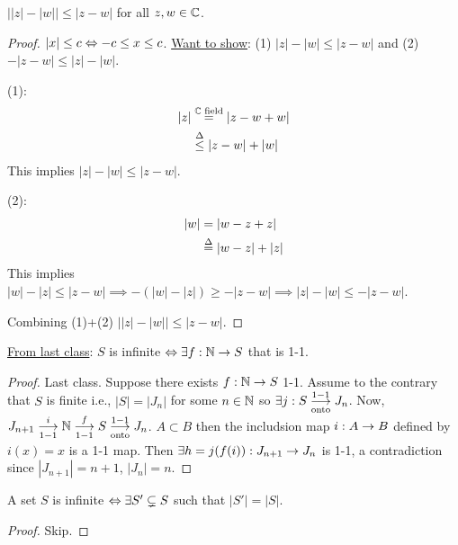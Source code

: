 \documentclass[]{article}
\begin{document}
\begin{example}
	[HW3.4] $\left| |z|-|w|\right| \leq |z-w|$ for all $z,w\in\mathbb{C}$.
	\begin{proof}
		$|x|\leq c \Leftrightarrow -c\leq x \leq c$.
		\ul{Want to show}: (1) $|z|-|w| \leq |z-w|$ and (2) $-|z-w|\leq |z|-|w|$.

		(1): 
		\begin{align*}
			|z| &\overset{\mathbb{C}\text{ field}}{=} |z-w+w| \\
				&\overset{\Delta}{\leq} |z-w| + |w|		
		\end{align*}
		This implies $|z|-|w|\leq |z-w|$.

		(2):
		\begin{align*}
			|w| &= |w-z+z| \\
				&\overset{\Delta}{=} |w-z|+|z|
		\end{align*}
		This implies $|w|-|z|\leq |z-w| \implies -(|w|-|z|) \geq -|z-w| \implies |z|-|w| \leq -|z-w|$.
		
		Combining (1)+(2) $\left||z|-|w|\right| \leq |z-w|$.
	\end{proof}
\end{example}

\begin{recall}
	\ul{From last class}: $S$ is infinite $\Leftrightarrow \exists f:\mathbb{N} \rightarrow S$ that is 1-1.
\end{recall}
\begin{proof}
	\say{$\implies$} Last class.
	\say{$\Lla$} Suppose there exists $f:\mathbb{N} \rightarrow S$ 1-1.
	Assume to the contrary that $S$ is finite i.e., $|S| = |J_n|$ for some $n\in\mathbb{N}$ so $\exists j:S\overset{1-1}{\underset{\text{onto}}{\longrightarrow}} J_n$.
	Now, $J_{n+1} \overset{i}{\underset{1-1}{\longrightarrow}} \mathbb{N} \overset{f}{\underset{1-1}{\longrightarrow}} S \overset{1-1}{\underset{\text{onto}}{\longrightarrow}} J_n$.
	$A\subset B$ then the includsion map $i:A\rightarrow B$ defined by $i(x) = x$ is a 1-1 map.
	Then $\exists h = j(f(i)): J_{n+1} \rightarrow J_n$ is 1-1, a contradiction since $|J_{n+1}| = n+1$, $|J_n| = n$.
\end{proof}
\begin{proposition}
	A set $S$ is infinite $\Leftrightarrow \exists S'\subsetneq S$ such that $|S'| = |S|$.
\end{proposition}
\begin{proof}
	Skip.
\end{proof}
\end{document}
